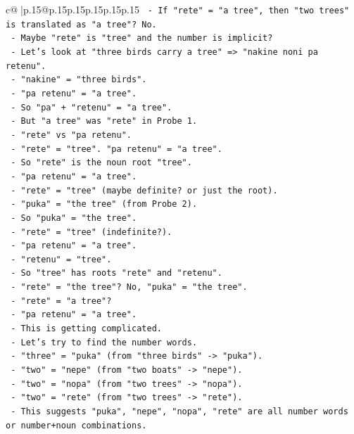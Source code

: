 \documentclass{article}
\begin{document}
{\begin{supertabular}{c@{$\;$}|p{.15\linewidth}@{}p{.15\linewidth}p{.15\linewidth}p{.15\linewidth}p{.15\linewidth}p{.15\linewidth}}
{{{\texttt{   {-} If "rete" = "a tree", then "two trees" is translated as "a tree"? No.} \\
\texttt{   {-} Maybe "rete" is "tree" and the number is implicit?} \\
\texttt{   {-} Let's look at "three birds carry a tree" => "nakine noni pa retenu".} \\
\texttt{   {-} "nakine" = "three birds".} \\
\texttt{   {-} "pa retenu" = "a tree".} \\
\texttt{   {-} So "pa" + "retenu" = "a tree".} \\
\texttt{   {-} But "a tree" was "rete" in Probe 1.} \\
\texttt{   {-} "rete" vs "pa retenu".} \\
\texttt{   {-} "rete" = "tree". "pa retenu" = "a tree".} \\
\texttt{   {-} So "rete" is the noun root "tree".} \\
\texttt{   {-} "pa retenu" = "a tree".} \\
\texttt{   {-} "rete" = "tree" (maybe definite? or just the root).} \\
\texttt{   {-} "puka" = "the tree" (from Probe 2).} \\
\texttt{   {-} So "puka" = "the tree".} \\
\texttt{   {-} "rete" = "tree" (indefinite?).} \\
\texttt{   {-} "pa retenu" = "a tree".} \\
\texttt{   {-} "retenu" = "tree".} \\
\texttt{   {-} So "tree" has roots "rete" and "retenu".} \\
\texttt{   {-} "rete" = "the tree"? No, "puka" = "the tree".} \\
\texttt{   {-} "rete" = "a tree"?} \\
\texttt{   {-} "pa retenu" = "a tree".} \\
\texttt{   {-} This is getting complicated.} \\
\texttt{   {-} Let's try to find the number words.} \\
\texttt{   {-} "three" = "puka" (from "three birds" {-}> "puka").} \\
\texttt{   {-} "two" = "nepe" (from "two boats" {-}> "nepe").} \\
\texttt{   {-} "two" = "nopa" (from "two trees" {-}> "nopa").} \\
\texttt{   {-} "two" = "rete" (from "two trees" {-}> "rete").} \\
\texttt{   {-} This suggests "puka", "nepe", "nopa", "rete" are all number words or number+noun combinations.} \\
}}}
\end{supertabular}}
\end{document}
